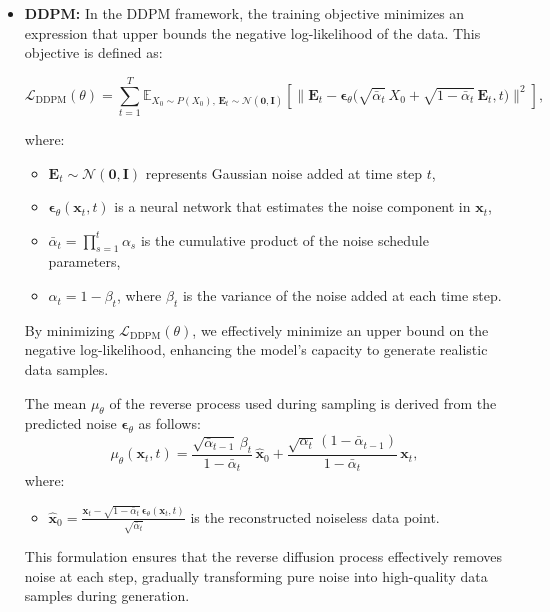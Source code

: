 \begin{itemize}
    \item \textbf{DDPM:} In the DDPM framework, the training objective minimizes an expression that upper bounds the negative log-likelihood of the data. This objective is defined as:

    \[
    \mathcal{L}_{\text{DDPM}}(\theta) = \sum_{t=1}^T \mathbb{E}_{X_0 \sim P(X_0),\, \mathbf{E}_t \sim \mathcal{N}(\mathbf{0}, \mathbf{I})} \left[ \bigl\| \mathbf{E}_t - \boldsymbol{\epsilon}_\theta\bigl(\sqrt{\bar{\alpha}_t}\, X_0 + \sqrt{1 - \bar{\alpha}_t}\, \mathbf{E}_t, t\bigr) \bigr\|^2 \right],
    \]

    where:
    \begin{itemize}
        \item \( \mathbf{E}_t \sim \mathcal{N}(\mathbf{0}, \mathbf{I}) \) represents Gaussian noise added at time step \( t \),
        \item \( \boldsymbol{\epsilon}_\theta(\mathbf{x}_t, t) \) is a neural network that estimates the noise component in \(\mathbf{x}_t\),
        \item \( \bar{\alpha}_t = \prod_{s=1}^t \alpha_s \) is the cumulative product of the noise schedule parameters,
        \item \( \alpha_t = 1 - \beta_t \), where \( \beta_t \) is the variance of the noise added at each time step.
    \end{itemize}

    By minimizing \( \mathcal{L}_{\text{DDPM}}(\theta) \), we effectively minimize an upper bound on the negative log-likelihood, enhancing the model's capacity to generate realistic data samples.

    The mean \( \mu_\theta \) of the reverse process used during sampling is derived from the predicted noise \( \mathbf{\epsilon}_\theta \) as follows:
    \[
    \mu_\theta(\mathbf{x}_t, t) = \frac{\sqrt{\bar{\alpha}_{t-1}}\, \beta_t}{1 - \bar{\alpha}_t}\, \hat{\mathbf{x}}_0 + \frac{\sqrt{\alpha_t}\, (1 - \bar{\alpha}_{t-1})}{1 - \bar{\alpha}_t}\, \mathbf{x}_t,
    \]
    where:
    \begin{itemize}
        \item \( \hat{\mathbf{x}}_0 = \frac{\mathbf{x}_t - \sqrt{1 - \bar{\alpha}_t}\, \mathbf{\epsilon}_\theta(\mathbf{x}_t, t)}{\sqrt{\bar{\alpha}_t}} \) is the reconstructed noiseless data point.
    \end{itemize}

    This formulation ensures that the reverse diffusion process effectively removes noise at each step, gradually transforming pure noise into high-quality data samples during generation.



\end{itemize}
